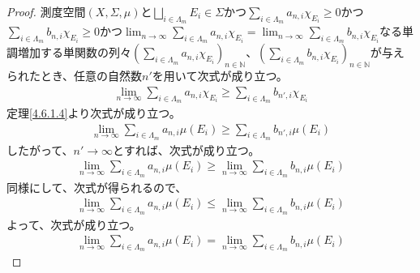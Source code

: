 \documentclass[dvipdfmx]{jsarticle}
\begin{document}
\begin{proof}
測度空間$(X,\varSigma,\mu)$と$\bigsqcup_{i \in \varLambda_{m}} E_{i} \in \varSigma$かつ$\sum_{i \in \varLambda_{m}} {a_{n,i}\chi_{E_{i}}} \geq 0$かつ$\sum_{i \in \varLambda_{m}} {b_{n,i}\chi_{E_{i}}} \geq 0$かつ$\lim_{n \rightarrow \infty}{\sum_{i \in \varLambda_{m}} {a_{n,i}\chi_{E_{i}}}} = \lim_{n \rightarrow \infty}{\sum_{i \in \varLambda_{m}} {b_{n,i}\chi_{E_{i}}}}$なる単調増加する単関数の列々$\left( \sum_{i \in \varLambda_{m}} {a_{n,i}\chi_{E_{i}}} \right)_{n \in \mathbb{N}}$、$\left( \sum_{i \in \varLambda_{m}} {b_{n,i}\chi_{E_{i}}} \right)_{n \in \mathbb{N}}$が与えられたとき、任意の自然数$n'$を用いて次式が成り立つ。
\begin{align*}
\lim_{n \rightarrow \infty}{\sum_{i \in \varLambda_{m}} {a_{n,i}\chi_{E_{i}}}} \geq \sum_{i \in \varLambda_{m}} {b_{n',i}\chi_{E_{i}}}
\end{align*}
定理\ref{4.6.1.4}より次式が成り立つ。
\begin{align*}
\lim_{n \rightarrow \infty}{\sum_{i \in \varLambda_{m}} {a_{n,i}\mu\left( E_{i} \right)}} \geq \sum_{i \in \varLambda_{m}} {b_{n',i}\mu\left( E_{i} \right)}
\end{align*}
したがって、$n' \rightarrow \infty$とすれば、次式が成り立つ。
\begin{align*}
\lim_{n \rightarrow \infty}{\sum_{i \in \varLambda_{m}} {a_{n,i}\mu\left( E_{i} \right)}} \geq \lim_{n \rightarrow \infty}{\sum_{i \in \varLambda_{m}} {b_{n,i}\mu\left( E_{i} \right)}}
\end{align*}
同様にして、次式が得られるので、
\begin{align*}
\lim_{n \rightarrow \infty}{\sum_{i \in \varLambda_{m}} {a_{n,i}\mu\left( E_{i} \right)}} \leq \lim_{n \rightarrow \infty}{\sum_{i \in \varLambda_{m}} {b_{n,i}\mu\left( E_{i} \right)}}
\end{align*}
よって、次式が成り立つ。
\begin{align*}
\lim_{n \rightarrow \infty}{\sum_{i \in \varLambda_{m}} {a_{n,i}\mu\left( E_{i} \right)}} = \lim_{n \rightarrow \infty}{\sum_{i \in \varLambda_{m}} {b_{n,i}\mu\left( E_{i} \right)}}
\end{align*}
\end{proof}
\end{document}
